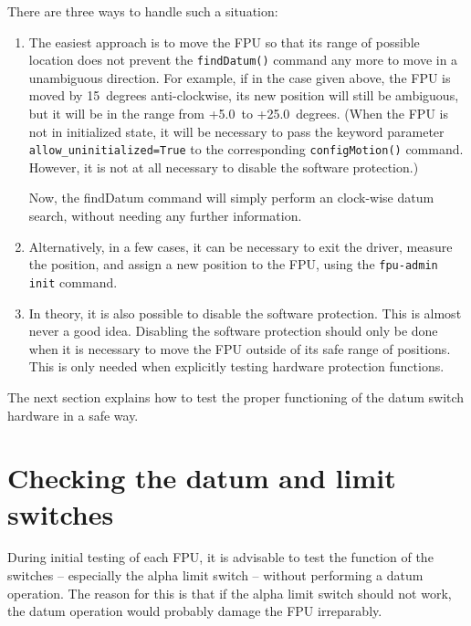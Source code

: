 \documentclass[11pt,a4paper]{report}
\begin{document}
There are three ways to handle such a situation:

\begin{enumerate}
\item The easiest approach is to move the FPU so that its range of
  possible location does not prevent the \texttt{findDatum()} command
  any more to move in a unambiguous direction. For example, if in the
  case given above, the FPU is moved by 15\degree\ degrees anti-clockwise, its
  new position will still be ambiguous, but it will be in the range
  from +5.0\degree\ to +25.0\degree\ degrees. (When the FPU is not in initialized
  state, it will be necessary to pass the keyword parameter
  \texttt{allow\_uninitialized=True} to the corresponding
  \texttt{configMotion()} command. However, it is not at all necessary
  to disable the software protection.)

  Now, the findDatum command will simply perform an clock-wise datum
  search, without needing any further information.

\item Alternatively, in a few cases, it can be necessary to exit the
  driver, measure the position, and assign a new position to the FPU,
  using the \texttt{fpu-admin init} command.

\item In theory, it is also possible to disable the software
  protection.  This is almost never a good idea. Disabling the
  software protection should only be done when it is necessary to move
  the FPU outside of its safe range of positions. This is only needed
  when explicitly testing hardware protection functions.
\end{enumerate}

The next section explains how to test the proper functioning of the
datum switch hardware in a safe way.


\section{Checking the datum and limit switches}
\label{sec:datumswitchcheck}

During initial testing of each FPU, it is advisable to test the
function of the switches -- especially the alpha limit switch --
without performing a datum operation. The reason for this is that if
the alpha limit switch should not work, the datum operation would
probably damage the FPU irreparably.
\end{document}
